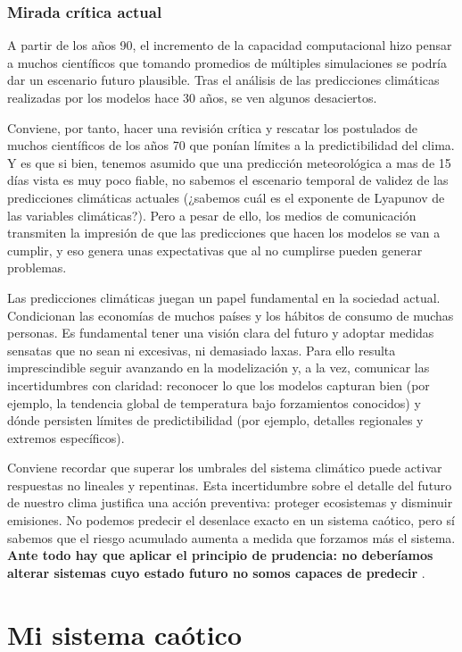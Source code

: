 \documentclass[
  10pt,
  a4paper,
  DIV=11,
  numbers=noendperiod,
  open=any]{scrreprt}
\numberwithin{equation}{chapter}
\numberwithin{equation}{section}
\renewcommand{\[}{\begin{equation}}
\renewcommand{\]}{\end{equation}}
\begin{document}
\section{Mirada crítica actual}\label{mirada-cruxedtica-actual}

A partir de los años 90, el incremento de la capacidad computacional
hizo pensar a muchos científicos que tomando promedios de múltiples
simulaciones se podría dar un escenario futuro plausible. Tras el análisis de las predicciones climáticas realizadas por los modelos hace 30 años, se ven algunos desaciertos. 

Conviene, por tanto, hacer una revisión crítica y rescatar los
postulados de muchos científicos de los años 70 que ponían límites a la
predictibilidad del clima. Y es que si bien, tenemos asumido que una
predicción meteorológica a mas de 15 días vista es muy poco fiable, no
sabemos el escenario temporal de validez de las predicciones climáticas
actuales (¿sabemos cuál es el exponente de Lyapunov de las variables
climáticas?). Pero a pesar de ello, los medios de comunicación
transmiten la impresión de que las predicciones que hacen los modelos se
van a cumplir, y eso genera unas expectativas que al no cumplirse pueden
generar problemas.

Las predicciones climáticas juegan un papel fundamental en la sociedad
actual. Condicionan las economías de muchos países y los hábitos de
consumo de muchas personas. Es fundamental tener una visión clara del
futuro y adoptar medidas sensatas que no sean ni excesivas, ni demasiado
laxas. Para ello resulta imprescindible seguir avanzando en la
modelización y, a la vez, comunicar las incertidumbres con claridad:
reconocer lo que los modelos capturan bien (por ejemplo, la tendencia
global de temperatura bajo forzamientos conocidos) y dónde persisten
límites de predictibilidad (por ejemplo, detalles regionales y extremos
específicos).

Conviene recordar que superar los umbrales del sistema climático puede activar respuestas no lineales y repentinas. Esta incertidumbre sobre el detalle del futuro de nuestro clima justifica una acción preventiva: proteger ecosistemas y disminuir emisiones. No podemos predecir el desenlace exacto en un sistema caótico, pero sí sabemos que el riesgo acumulado aumenta a medida que forzamos más el sistema. \textbf{Ante todo hay que aplicar el principio de prudencia: no deberíamos alterar sistemas cuyo estado futuro no somos capaces de predecir }. 

\part{Mi sistema caótico}
\end{document}
